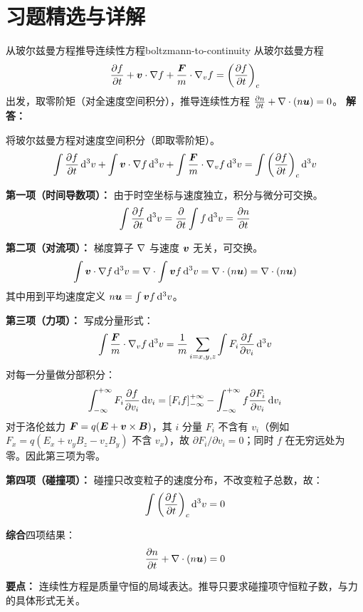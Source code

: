 
\section*{习题精选与详解}
{}

\begin{example}{从玻尔兹曼方程推导连续性方程}{boltzmann-to-continuity}
从玻尔兹曼方程
\[
\frac{\partial f}{\partial t} + \bm{v}\cdot\nabla f + \frac{\bm{F}}{m}\cdot\nabla_v f = \left(\frac{\partial f}{\partial t}\right)_c
\]
出发，取零阶矩（对全速度空间积分），推导连续性方程 $\frac{\partial n}{\partial t} + \nabla\cdot(n\bm{u}) = 0$。
\tcblower
\textbf{解答：}

将玻尔兹曼方程对速度空间积分（即取零阶矩）。
\[
\int\frac{\partial f}{\partial t}\,\mathrm{d}^3 v + \int\bm{v}\cdot\nabla f\,\mathrm{d}^3 v + \int\frac{\bm{F}}{m}\cdot\nabla_v f\,\mathrm{d}^3 v = \int\left(\frac{\partial f}{\partial t}\right)_c\mathrm{d}^3 v
\]

\textbf{第一项（时间导数项）：} 由于时空坐标与速度独立，积分与微分可交换。
\[
\int\frac{\partial f}{\partial t}\,\mathrm{d}^3 v = \frac{\partial}{\partial t}\int f\,\mathrm{d}^3 v = \frac{\partial n}{\partial t}
\]

\textbf{第二项（对流项）：} 梯度算子 $\nabla$ 与速度 $\bm{v}$ 无关，可交换。
\[
\int\bm{v}\cdot\nabla f\,\mathrm{d}^3 v = \nabla\cdot\int\bm{v}f\,\mathrm{d}^3 v = \nabla\cdot(n\bm{u}) = \nabla\cdot(n\bm{u})
\]
其中用到平均速度定义 $n\bm{u} = \int\bm{v}f\,\mathrm{d}^3 v$。

\textbf{第三项（力项）：} 写成分量形式：
\[
\int\frac{\bm{F}}{m}\cdot\nabla_v f\,\mathrm{d}^3 v = \frac{1}{m}\sum_{i=x,y,z}\int F_i\frac{\partial f}{\partial v_i}\,\mathrm{d}^3 v
\]
对每一分量做分部积分：
\[
\int_{-\infty}^{+\infty} F_i\frac{\partial f}{\partial v_i}\,\mathrm{d} v_i = \left[F_i f\right]_{-\infty}^{+\infty} - \int_{-\infty}^{+\infty} f\frac{\partial F_i}{\partial v_i}\,\mathrm{d} v_i
\]
对于洛伦兹力 $\bm{F} = q(\bm{E} + \bm{v}\times\bm{B})$，其 $i$ 分量 $F_i$ 不含有 $v_i$（例如 $F_x = q(E_x + v_y B_z - v_z B_y)$ 不含 $v_x$），故 $\partial F_i/\partial v_i = 0$；同时 $f$ 在无穷远处为零。因此第三项为零。

\textbf{第四项（碰撞项）：} 碰撞只改变粒子的速度分布，不改变粒子总数，故：
\[
\int\left(\frac{\partial f}{\partial t}\right)_c\mathrm{d}^3 v = 0
\]

\textbf{综合}四项结果：
\[
\frac{\partial n}{\partial t} + \nabla\cdot(n\bm{u}) = 0
\]

\textbf{要点：} 连续性方程是质量守恒的局域表达。推导只要求碰撞项守恒粒子数，与力的具体形式无关。
\end{example}

